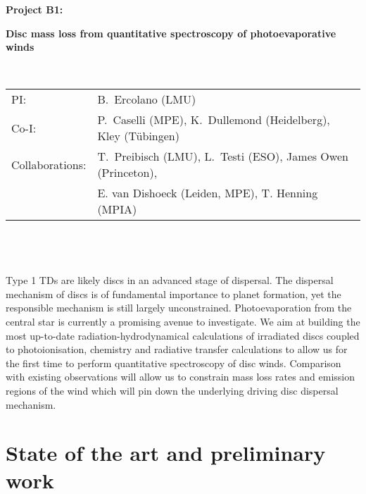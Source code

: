 \documentclass[10pt,fleqn,twoside]{article}
\newcommand{\Tcol}{\color{blue}}
\begin{document}
\newpage


\setcounter{page}{1}

\centerline{\huge\bf\Tcol
%
%
%
%
%
 Project B1:}

\centerline{\huge\bf\Tcol Disc mass loss from quantitative spectroscopy
of photoevaporative winds}

%
%
%
%
%
\vskip1.0cm

\\
\begin{tabular}{ll}
{\textsf{PI:}}                  & B.~Ercolano (LMU)\\
{\textsf{Co-I:}}                &P.~Caselli (MPE), K.~Dullemond (Heidelberg), Kley (T\"ubingen)\\
{\textsf{Collaborations:}}      & T.~Preibisch (LMU), L.~Testi (ESO), James Owen (Princeton), \\
& E. van Dishoeck (Leiden, MPE), T. Henning (MPIA)  \\
\end{tabular}


\vspace{1em}
 \\

\vspace{1em}
\\

\\
Type 1 TDs are likely discs in an advanced stage of dispersal. The
dispersal mechanism of discs is of fundamental importance to planet
formation, yet the responsible mechanism is still largely
unconstrained. Photoevaporation from the central star is currently a
promising avenue to investigate. We aim at building the most
up-to-date radiation-hydrodynamical calculations of irradiated discs
coupled to photoionisation, chemistry and radiative transfer
calculations to allow us for the first time to perform quantitative
spectroscopy of disc winds. Comparison with existing observations will
allow us to constrain mass loss rates and emission regions of the wind
which will pin down the underlying driving disc dispersal mechanism.


\section{\Tcol State of the art and preliminary work}
\renewcommand{\leftmark}{\sc State of the Art and preliminary work}
\end{document}
